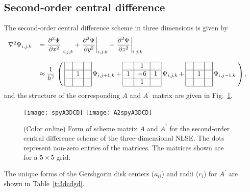 \documentclass{article}
\begin{document}
\subsection{Second-order central difference}
\label{3dcdstb}
The second-order central difference scheme in three dimensions is given by
\begin{equation}
\label{3dcds}
\begin{tabular}{ll}
$\nabla^2\Psi_{i,j,k}$ & $ = \left. \dfrac{\partial^2 \Psi}{\partial x^2} \right|_{i,j,k} + \left. \dfrac{\partial^2 \Psi}{\partial y^2} \right|_{i,j,k} + \left. \dfrac{\partial^2 \Psi}{\partial z^2} \right|_{i,j,k} $ \\
\; \; \\
\; & $\approx \dfrac{1}{h^2}$
$\left(\;
\begin{tabular}{|c|c|c|} \hline
  &   &   \\ \hline
  & $1$ &  \\ \hline
  &   &   \\ \hline
\end{tabular}
 \, \Psi_{i,j+1,k} +  
 \begin{tabular}{|c|c|c|} \hline
  & $1$ &   \\ \hline
$1$  & $-6$ & $1$ \\ \hline
  & $1$ &   \\ \hline
\end{tabular}
\, \Psi_{i,j,k} +  
\begin{tabular}{|c|c|c|} \hline
  &   &   \\ \hline
  & $1$ & \\ \hline
  &   &   \\ \hline
\end{tabular}
 \, \Psi_{i,j-1,k} \; \right),$ 
 \end{tabular}
\end{equation}
and the structure of the corresponding $A$ and $A^{\prime}$ matrix are given in Fig.~\ref{f:A3DCD}.
\begin{figure}[htbp]
\centering
\texttt{[image: spyA3DCD]}
\texttt{[image: A2spyA3DCD]}
\caption[Matrix structure for three-dimensional CD scheme.]{(Color online) Form of scheme matrix $A$ and $A^{\prime}$ for the second-order central difference scheme of the three-dimensional NLSE.  The dots represent non-zero entries of the matrices.  The matrices shown are for a $5 \times 5$ grid. \label{f:A3DCD}}
\end{figure}
The unique forms of the Gershgorin disk centers ($a_{ii}$) and radii ($r_i$) for $A^{\prime}$ are shown in Table~\ref{t:3dcdgd}.
\end{document}
